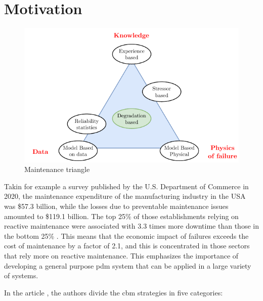 \section{Motivation}
\label{sec:motivation}

\begin{figure}
    \centering
    \includegraphics[scale=1.3]{images/Intro/MaintTriangle.pdf}
    \caption{Maintenance triangle}
    \label{fig:MaintTriangle}
\end{figure} 

Takin for example a survey published by the U.S. Department of Commerce in 2020, the maintenance expenditure of the manufacturing industry in the USA was \$57.3 billion, while the losses due to preventable maintenance issues amounted to \$119.1 billion. The top 25\% of those 
establishments relying on reactive maintenance were associated with 3.3 times more downtime 
than those in the bottom 25\% \cite{NIST}. This means that the economic impact of failures exceeds the cost of maintenance by a factor of 2.1, and this is concentrated in those sectors that rely more on reactive maintenance. This emphasizes the importance of developing a general purpose \gls{pdm} system that can be applied in a large variety of systems.

In the article \cite{Maintenance_cat}, the authors divide the \gls{cbm} strategies in five categories:

